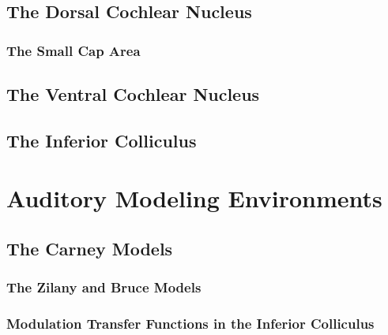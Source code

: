 \subsection{The Dorsal Cochlear Nucleus} %
\label{sub:the_dorsal_cochlear_nucleus}
\subsubsection{The Small Cap Area} %
\label{ssub:the_small_cap_area}

\subsection{The Ventral Cochlear Nucleus} %
\label{sub:the_ventral_cochlear_nucleus}

\subsection{The Inferior Colliculus} %
\label{sub:the_inferior_colliculus}


\section{Auditory Modeling Environments} %
\label{sec:auditory_modeling_environments}
\subsection{The Carney Models} %
\label{sub:the_carney_models}
\subsubsection{The Zilany and Bruce Models} %
\label{ssub:zilany_and_bruce_2009_2014}

\subsubsection{Modulation Transfer Functions in the Inferior Colliculus} %
\label{ssub:modulation_transfer_functions_in_the_inferior_colliculus}


